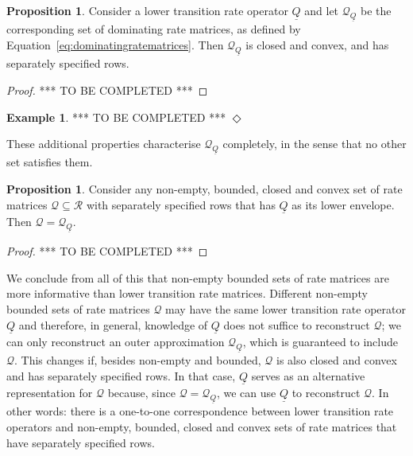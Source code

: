 \documentclass[10pt]{paper}
\theoremstyle{definition}
\newtheorem{exmp}{Example}%
\newtheorem{proposition}[theorem]{Proposition}
\newcommand{\rateset}{\mathcal{Q}}
\newcommand{\lrate}{\underline{Q}}
\newcommand{\exampleend}{\hfill$\Diamond$}
\begin{document}
\begin{proposition}\label{prop:dominatingproperties}
Consider a lower transition rate operator $\lrate$ and let $\rateset_{\lrate}$ be the corresponding set of dominating rate matrices, as defined by Equation~\eqref{eq:dominatingratematrices}. Then $\rateset_{\lrate}$ is closed and convex, and has separately specified rows.
\end{proposition}
\begin{proof}
*** TO BE COMPLETED ***
\end{proof}


\begin{exmp}
*** TO BE COMPLETED ***
\exampleend
\end{exmp}

\noindent
These additional properties characterise $\rateset_{\lrate}$ completely, in the sense that no other set satisfies them.

\begin{proposition}
Consider any non-empty, bounded, closed and convex set of rate matrices $\rateset\subseteq\mathcal{R}$ with separately specified rows that has $\lrate$ as its lower envelope. Then $\rateset=\rateset_{\lrate}$.
\end{proposition}
\begin{proof}
*** TO BE COMPLETED ***
\end{proof}

We conclude from all of this that non-empty bounded sets of rate matrices are more informative than lower transition rate matrices. Different non-empty bounded sets of rate matrices $\rateset$ may have the same lower transition rate operator $\lrate$ and therefore, in general, knowledge of $\lrate$ does not suffice to reconstruct $\rateset$; we can only reconstruct an outer approximation $\rateset_{\lrate}$, which is guaranteed to include $\rateset$. This changes if, besides non-empty and bounded, $\rateset$ is also closed and convex and has separately specified rows. In that case, $\lrate$ serves as an alternative representation for $\rateset$ because, since $\rateset=\rateset_{\lrate}$, we can use $\lrate$ to reconstruct $\rateset$. In other words: there is a one-to-one correspondence between lower transition rate operators and non-empty, bounded, closed and convex sets of rate matrices that have separately specified rows.

\end{document}
